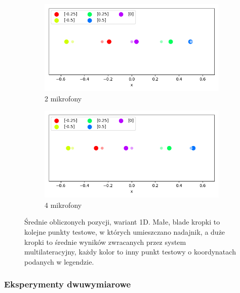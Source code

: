 \begin{figure}[H]
    \centering
    \begin{subfigure}{.5\textwidth}
        \centering
        \includegraphics[width=\linewidth]{pics/mult_lat_1d/positions_2_mean.png}
        \caption{2 mikrofony}
        \label{pic:1d_2_mult}
    \end{subfigure}%
    \begin{subfigure}{.5\textwidth}
        \centering
        \includegraphics[width=\linewidth]{pics/mult_lat_1d/positions_4_mean.png}
        \caption{4 mikrofony}
        \label{pic:1d_4_mult}
    \end{subfigure}
    \caption[Wyniki eksperymentu dla wersji 1D]{Średnie obliczonych pozycji, wariant 1D. Małe, blade kropki to kolejne punkty testowe, w których umieszczano nadajnik, a duże kropki to średnie wyników zwracanych przez system multilateracyjny, każdy kolor to inny punkt testowy o koordynatach podanych w legendzie.}
    \label{fig:1d_mult}
\end{figure}

\subsubsection{Eksperymenty dwuwymiarowe}


